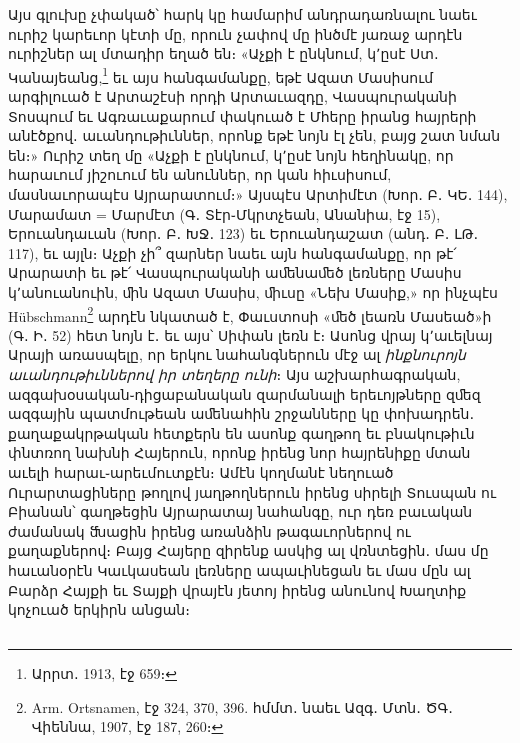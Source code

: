\documentclass{article}
\begin{document}
{Այս գլուխը չփակած՝ հարկ կը համարիմ անդրադառնալու նաեւ ուրիշ կարեւոր կէտի մը, որուն չափով մը ինծմէ յառաջ արդէն ուրիշներ ալ մտադիր եղած են։ «Աչքի է ընկնում, կ՚ըսէ Ստ․ Կանայեանց,\footnote{Արրտ․ 1913, էջ 659։} եւ այս հանգամանքը, եթէ Ազատ Մասիսում արգիլուած է Արտաշէսի որդի Արտաւազդը, Վասպուրականի Տոսպում եւ Ագռաւաքարում փակուած է Մհերը իրանց հայրերի անէծքով․ աւանդութիւններ, որոնք եթէ նոյն էլ չեն, բայց շատ նման են։» Ուրիշ տեղ մը «Աչքի է ընկնում, կ՚ըսէ նոյն հեղինակը, որ հարաւում յիշուում են անուններ, որ կան հիւսիսում, մասնաւորապէս Այրարատում։» Այսպէս Արտիմէտ (Խոր․ Բ․ ԿԵ․ 144), Մարամատ = Մարմէտ (Գ․ Տէր֊Մկրտչեան, Անանիա, էջ 15), Երուանդաւան (Խոր․ Բ․ ԽՋ․ 123) եւ Երուանդաշատ (անդ․ Բ․ ԼԹ․ 117), եւ այլն։ Աչքի չի՞ զարներ նաեւ այն հանգամանքը, որ թէ՛ Արարատի եւ թէ՛ Վասպուրականի աﬔնաﬔծ լեռները Մասիս կ՚անուանուին, ﬕն Ազատ Մասիս, ﬕւսը «Նեխ Մասիք,» որ ինչպէս Hübschmann\footnote{Arm. Ortsnamen, էջ 324, 370, 396. հմմտ․ նաեւ Ազգ․ Մտն․ ԾԳ․ Վիեննա, 1907, էջ 187, 260։} արդէն նկատած է, Փաւստոսի «ﬔծ լեառն Մասեած»ի (Գ․ Ի․ 52) հետ նոյն է․ եւ այս՝ Սիփան լեռն է։ Ասոնց վրայ կ՚աւելնայ Արայի առասպելը, որ երկու նահանգներուն մէջ ալ \emph{ինքնուրոյն աւանդութիւններով իր տեղերը ունի}։ Այս աշխարհագրական, ազգախօսական֊դիցաբանական զարմանալի երեւոյթները զﬔզ ազգային պատմութեան աﬔնահին շրջանները կը փոխադրեն․ քաղաքակրթական հետքերն են ասոնք գաղթող եւ բնակութիւն փնտռող նախնի Հայերուն, որոնք իրենց նոր հայրենիքը մտան աւելի հարաւ֊արեւմուտքէն։ Ամէն կողմանէ նեղուած Ուրարտացիները թողլով յաղթողներուն իրենց սիրելի Տուսպան ու Բիանան՝ գաղթեցին Այրարատայ նահանգը, ուր դեռ բաւական ժամանակ ﬓացին իրենց առանձին թագաւորներով ու քաղաքներով։ Բայց Հայերը զիրենք ասկից ալ վռնտեցին․ մաս մը հաւանօրէն Կաւկասեան լեռները ապաւինեցան եւ մաս մըն ալ Բարձր Հայքի եւ Տայքի վրայէն յետոյ իրենց անունով Խաղտիք կոչուած երկիրն անցան։}
\clearpage
\subsection{}
\end{document}
